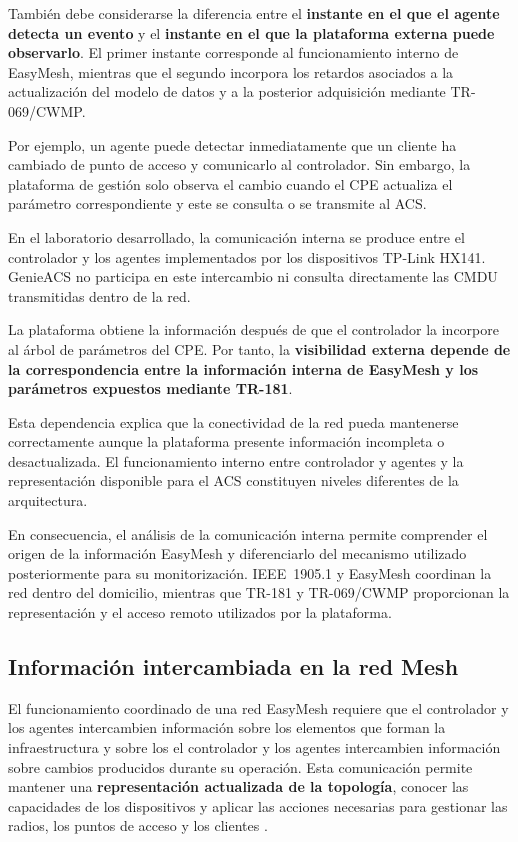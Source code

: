 También debe considerarse la diferencia entre el
\textbf{instante en el que el agente detecta un evento} y el
\textbf{instante en el que la plataforma externa puede observarlo}. El
primer instante corresponde al funcionamiento interno de EasyMesh,
mientras que el segundo incorpora los retardos asociados a la
actualización del modelo de datos y a la posterior adquisición mediante
TR-069/CWMP.

Por ejemplo, un agente puede detectar inmediatamente que un cliente ha
cambiado de punto de acceso y comunicarlo al controlador. Sin embargo, la
plataforma de gestión solo observa el cambio cuando el CPE actualiza el
parámetro correspondiente y este se consulta o se transmite al ACS.

En el laboratorio desarrollado, la comunicación interna se produce entre
el controlador y los agentes implementados por los dispositivos TP-Link
HX141. GenieACS no participa en este intercambio ni consulta directamente
las CMDU transmitidas dentro de la red.

La plataforma obtiene la información después de que el controlador la
incorpore al árbol de parámetros del CPE. Por tanto, la
\textbf{visibilidad externa depende de la correspondencia entre la
información interna de EasyMesh y los parámetros expuestos mediante
TR-181}.

Esta dependencia explica que la conectividad de la red pueda mantenerse
correctamente aunque la plataforma presente información incompleta o
desactualizada. El funcionamiento interno entre controlador y agentes y
la representación disponible para el ACS constituyen niveles diferentes
de la arquitectura.

En consecuencia, el análisis de la comunicación interna permite
comprender el origen de la información EasyMesh y diferenciarlo del
mecanismo utilizado posteriormente para su monitorización. IEEE~1905.1 y
EasyMesh coordinan la red dentro del domicilio, mientras que TR-181 y
TR-069/CWMP proporcionan la representación y el acceso remoto utilizados
por la plataforma.

\subsection{Información intercambiada en la red Mesh}
\label{subsec:informacion-intercambiada-red-mesh}

El funcionamiento coordinado de una red EasyMesh requiere que el
controlador y los agentes intercambien información sobre los elementos
que forman la infraestructura y sobre los el
controlador y los agentes intercambien información sobre cambios producidos durante su
operación. Esta comunicación permite mantener una
\textbf{representación actualizada de la topología}, conocer las
capacidades de los dispositivos y aplicar las acciones necesarias para
gestionar las radios, los puntos de acceso y los clientes
\cite{wifi_alliance_easymesh,ieee_1905_1}.

